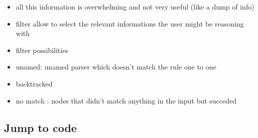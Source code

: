 		\begin{itemize}
			\item all this information is overwhelming and not very useful (like a dump of info)
			\item filter allow to select the relevant informations the user might be reasoning with
			\item filter possibilities
			\item unamed: unamed parser which doesn't match the rule one to one 
			\item backtracked
			\item no match : nodes that didn't match anything in the input but succeded
		\end{itemize}

		\subsection{Jump to code}



